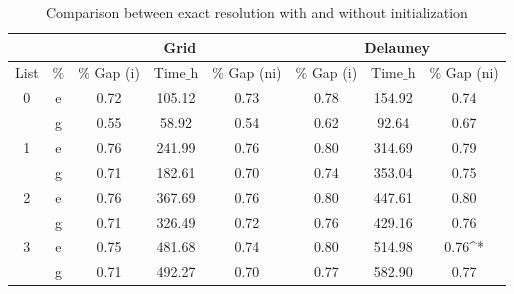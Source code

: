 \renewcommand{\arraystretch}{0.7}
\begin{table}[!h]
\caption{Comparison between exact resolution with and without initialization}
\centering
\footnotesize
\begin{tabular}{c c | c c c | c c c}
\hline
 &  & \multicolumn{3}{c}{\textbf{Grid}} &  \multicolumn{3}{c}{\textbf{Delauney}} \\
\hline
 List &  $\%$  & $\%$ Gap (i) & Time$\_$h & $\%$ Gap (ni)  & $\%$ Gap (i) & Time$\_$h &  $\%$ Gap (ni)\\
\hline
\multirow{}{}{0} & e & 0.72 & 105.12 & 0.73 & 0.78 & 154.92 & 0.74\\
& g & 0.55 & 58.92 & 0.54 & 0.62 & 92.64 & 0.67\\
\hline
\multirow{}{}{1} & e & 0.76 & 241.99 & 0.76 & 0.80 & 314.69 & 0.79\\
& g & 0.71 & 182.61 & 0.70 & 0.74 & 353.04 & 0.75\\
\hline
\multirow{}{}{2} & e & 0.76 & 367.69 & 0.76 & 0.80 & 447.61 & 0.80 \\
& g & 0.71 & 326.49 & 0.72 & 0.76 & 429.16 & 0.76\\
\hline
\multirow{}{}{3} & e & 0.75 & 481.68 & 0.74 & 0.80 & 514.98 & 0.76^*\\
& g & 0.71 & 492.27 & 0.70 & 0.77 & 582.90 & 0.77\\
    \hline
\end{tabular}
\label{table:tab4}
\end{table}


